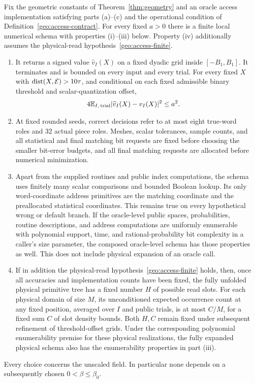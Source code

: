 \begin{lemma}\label{lem:geometric-procedures}
Fix the geometric constants of Theorem~\ref{thm:geometry} and an
oracle access implementation satisfying parts (a)--(c) and the
operational condition of Definition~\ref{geo:access-contract}.
For every fixed $a>0$ there is a finite local numerical schema with
properties (i)--(iii) below. Property (iv) additionally assumes the
physical-read hypothesis~\ref{geo:access-finite}.
\begin{enumerate}[label=\textup{(\roman*)},leftmargin=*]
\item It returns a signed value $\widehat v_I(X)$ on a fixed dyadic grid
inside $[-B_1,B_1]$. It terminates and is bounded on every input and
every trial. For every fixed $X$ with $\operatorname{dist}(X,\mathcal E)>10\tau$,
and conditional on each fixed admissible binary threshold and
scalar-quantization offset,
\begin{equation}\label{geo:average-accuracy}
 4\mathbb{E}_{I,\,\mathrm{trial}}
       |\widehat v_I(X)-v_I(X)|^2\le a^2.
\end{equation}
\item At fixed rounded seeds, correct decisions refer to at most eight
true-word roles and 32 actual piece roles. Meshes, scalar tolerances,
sample counts, and all statistical and final matching bit requests
are fixed before choosing the smaller bit-error budgets, and all final
matching requests are allocated before numerical minimization.
\item Apart from the supplied routines and public index computations,
the schema uses finitely many scalar comparisons and bounded Boolean
lookup. Its only word-coordinate address primitives are the matching
coordinate and the preallocated statistical coordinates. This remains
true on every hypothetical wrong or default branch.
If the oracle-level public spaces, probabilities, routine descriptions,
and address computations are uniformly enumerable with polynomial
support, time, and rational-probability bit complexity in a caller's
size parameter, the composed oracle-level schema has those properties
as well. This does not include physical expansion of an oracle call.
\item If in addition the physical-read
hypothesis~\ref{geo:access-finite} holds, then, once all accuracies and
implementation counts have been fixed, the fully unfolded physical
primitive tree has a fixed number $H$ of possible read slots. For each
physical domain of size $M$, its unconditioned
expected occurrence count at any fixed position, averaged over $I$
and public trials, is at most $C/M$, for a fixed sum $C$ of slot
density bounds. Both $H,C$ remain fixed under subsequent refinement
of threshold-offset grids. Under the corresponding polynomial
enumerability premise for these physical realizations, the fully
expanded physical schema also has the enumerability properties in
part (iii).
\end{enumerate}
Every choice concerns the unscaled field. In particular none depends
on a subsequently chosen $0<\beta\le\beta_0$.
\end{lemma}


